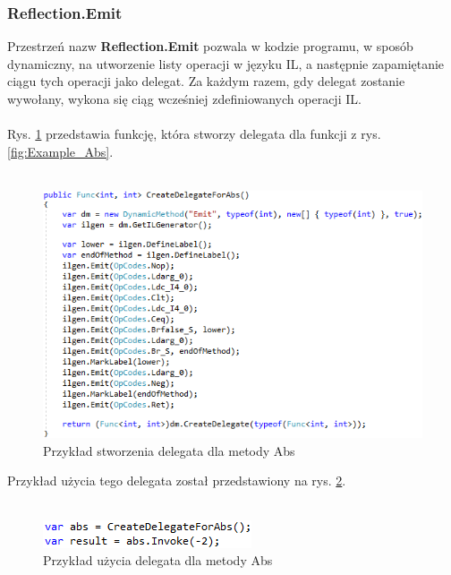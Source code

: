 \documentclass[12pt]{article}
\begin{document}
\subsubsection{Reflection.Emit}
Przestrzeń nazw \textbf{Reflection.Emit} pozwala w kodzie programu, w sposób dynamiczny, na utworzenie listy operacji w języku IL, a następnie zapamiętanie ciągu tych operacji jako delegat. Za każdym razem, gdy delegat zostanie wywołany, wykona się ciąg wcześniej zdefiniowanych operacji IL.\\
\\
Rys. \ref{fig:Example_Emit} przedstawia funkcję, która stworzy delegata dla funkcji z rys. \ref{fig:Example_Abs}.\\ \\
\begin{figure}[H]
	\begin{center}
  		\includegraphics{Example_Emit.png}
  		\caption{Przykład stworzenia delegata dla metody Abs}
  		\label{fig:Example_Emit}
	\end{center}
\end{figure}
Przykład użycia tego delegata został przedstawiony na rys. \ref{fig:Example_Delegate}.\\ \\
\begin{figure}[H]
	\begin{center}
  		\includegraphics{Example_Delegate.png}
  		\caption{Przykład użycia delegata dla metody Abs}
  		\label{fig:Example_Delegate}
	\end{center}
\end{figure}
\end{document}
